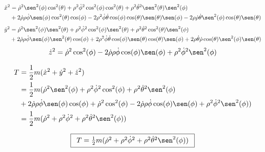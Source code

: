 \begin{equation*}
\begin{split}
    \dot{x}^2&=\dot{\rho}^2\sen^2(\phi)\cos^2(\theta)+
               \rho^2\dot{\phi}^2\cos^2(\phi)\cos^2(\theta)+
               \rho^2\dot{\theta}^2\sen^2(\theta)\sen^2(\phi)\\
             &+2\dot{\rho}\rho\dot{\phi}\sen(\phi)\cos^2(\theta)\cos(\phi)-
               2\rho^2\dot{\phi}\dot{\theta}
               \cos(\phi)\cos(\theta)\sen(\theta)\sen(\phi)-
               2\rho\dot{\rho}\dot{\theta}
               \sen^2(\phi)\cos(\theta)\sen(\theta)\\
\end{split}
\end{equation*}
\begin{equation*}
\begin{split}
    \dot{y}^2&=\dot{\rho}^2\sen^2(\phi)\sen^2(\theta)+
               \rho^2\dot{\phi}^2\cos^2(\phi)\sen^2(\theta)+
               \rho^2\dot{\theta}^2\cos^2(\theta)\sen^2(\phi)\\
             &+2\dot{\rho}\rho\dot{\phi}\sen(\phi)\sen^2(\theta)\cos(\phi)+
               2\rho^2\dot{\phi}\dot{\theta}
               \cos(\phi)\sen(\theta)\cos(\theta)\sen(\phi)+
               2\rho\dot{\theta}\dot{\rho}
               \cos(\theta)\sen^2(\phi)\sen(\theta)
\end{split}
\end{equation*}
\begin{equation*}
    \dot{z}^2=\dot{\rho}^2\cos^2(\phi)-
              2\dot{\rho}\rho\dot{\phi}\cos(\phi)\sen(\phi)+
              \rho^2\dot{\phi}^2\sen^2(\phi)
\end{equation*}

\begin{equation*}
\begin{split}
    T&=\frac{1}{2}m(\dot{x}^2+\dot{y}^2+\dot{z}^2)\\
     &=\frac{1}{2}m(\dot{\rho}^2\sen^2(\phi)+
       \rho^2\dot{\phi}^2\cos^2(\phi)+
       \rho^2\dot{\theta}^2\sen^2(\phi)\\
     &+2\dot{\rho}\rho\dot{\phi}\sen(\phi)\cos(\phi)+
       \dot{\rho}^2\cos^2(\phi)-
       2\dot{\rho}\rho\dot{\phi}\cos(\phi)\sen(\phi)+
       \rho^2\dot{\phi}^2\sen^2(\phi))\\
     &=\frac{1}{2}m(\dot{\rho}^2+
       \rho^2\dot{\phi}^2+
       \rho^2\dot{\theta}^2\sen^2(\phi))
\end{split}
\end{equation*}

\begin{equation}
\boxed{
    \begin{array}{l}
        T=\frac{1}{2}m(\dot{\rho}^2+
        \rho^2\dot{\phi}^2+
        \rho^2\dot{\theta}^2\sen^2(\phi))
    \end{array}
}
\end{equation}

